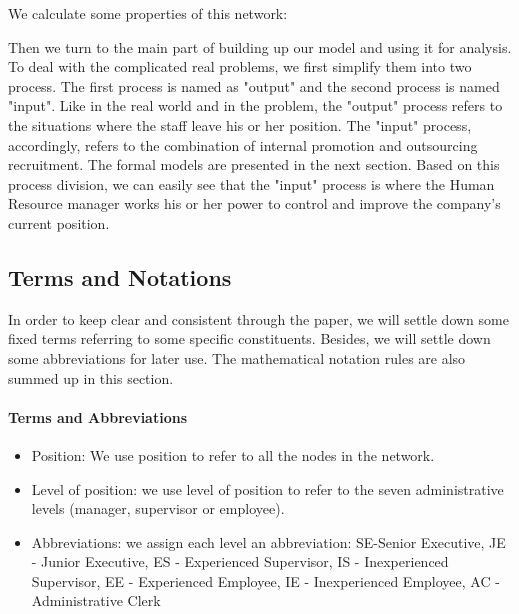 \documentclass[tcn = 37075, sheet = true, abstract = true]{mcmthesis}
\begin{document}
We calculate some properties of this network:

Then we turn to the main part of building up our model and using it for analysis. To deal with the complicated real problems, we first simplify them into two process. The first process is named as "output" and the second process is named "input". Like in the real world and in the problem, the "output" process refers to the situations where the staff leave his or her position. The "input" process, accordingly, refers to the combination of internal promotion and outsourcing recruitment. The formal models are presented in the next section. Based on this process division, we can easily see that the "input" process is where the Human Resource manager works his or her power to control and improve the company's current position.

\subsection{Terms and Notations}

In order to keep clear and consistent through the paper, we will settle down some fixed terms referring to some specific constituents. Besides, we will settle down some abbreviations for later use. The mathematical notation rules are also summed up in this section.

\paragraph{Terms and Abbreviations}
\begin{itemize}
\item Position: We use position to refer to all the nodes in the network.
\item Level of position: we use level of position to refer to the seven administrative levels (manager, supervisor or employee).
\item Abbreviations: we assign each level an abbreviation: SE-Senior Executive, JE -  Junior Executive, ES - Experienced Supervisor, IS - Inexperienced Supervisor, EE - Experienced Employee, IE - Inexperienced Employee, AC - Administrative Clerk
\end{itemize}
\end{document}
